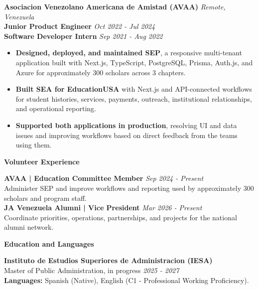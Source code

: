 \documentclass[10pt]{article}
\newcommand{\sectiontitle}[1]{%
    \vspace{4pt}
    \begin{center}
        \textbf{#1}
    \end{center}
    \vspace{-5pt}
}
\begin{document}
\vspace{2pt}
\textbf{Asociacion Venezolano Americana de Amistad (AVAA)} \hfill \textit{Remote, Venezuela} \\
\textbf{Junior Product Engineer} \hfill \textit{Oct 2022 - Jul 2024} \\
\textbf{Software Developer Intern} \hfill \textit{Sep 2021 - Aug 2022}
\begin{itemize}
    \item \textbf{Designed, deployed, and maintained SEP}, a responsive multi-tenant application built with Next.js, TypeScript, PostgreSQL, Prisma, Auth.js, and Azure for approximately 300 scholars across 3 chapters.
    \item \textbf{Built SEA for EducationUSA} with Next.js and API-connected workflows for student histories, services, payments, outreach, institutional relationships, and operational reporting.
    \item \textbf{Supported both applications in production}, resolving UI and data issues and improving workflows based on direct feedback from the teams using them.
\end{itemize}

\sectiontitle{Volunteer Experience}
\textbf{AVAA | Education Committee Member} \hfill \textit{Sep 2024 - Present} \\
Administer SEP and improve workflows and reporting used by approximately 300 scholars and program staff. \\
\textbf{JA Venezuela Alumni | Vice President} \hfill \textit{Mar 2026 - Present} \\
Coordinate priorities, operations, partnerships, and projects for the national alumni network.

\sectiontitle{Education and Languages}
\textbf{Instituto de Estudios Superiores de Administracion (IESA)} \\
Master of Public Administration, in progress \hfill \textit{2025 - 2027} \\
\textbf{Languages:} Spanish (Native), English (C1 - Professional Working Proficiency).
\end{document}
